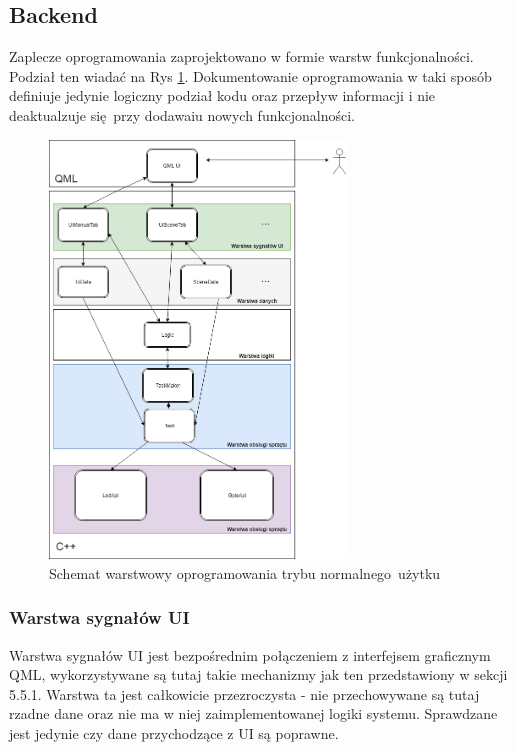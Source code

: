 \documentclass[12pt, eng, twoside, openany, final]{mgr}
\begin{document}
                \subsection{Backend}
                Zaplecze oprogramowania zaprojektowano w formie warstw funkcjonalności. Podział ten wiadać na Rys \ref{fig:layers}. Dokumentowanie oprogramowania w taki sposób definiuje jedynie logiczny podział kodu oraz przepływ informacji i nie deaktualzuje się przy dodawaiu nowych funkcjonalności.  
                    \begin{figure}[H]
                    \begin{center}
                        \includegraphics[width=0.7\textwidth]{inz_diag.png}
                        \caption{Schemat warstwowy oprogramowania trybu normalnego~użytku} \label{fig:layers}
                    \end{center}
                    \end{figure}
                \subsubsection{Warstwa sygnałów UI}
                Warstwa sygnałów UI jest bezpośrednim połączeniem z interfejsem graficznym QML, wykorzystywane są tutaj takie mechanizmy jak ten przedstawiony w sekcji 5.5.1. Warstwa ta jest całkowicie przezroczysta - nie przechowywane są tutaj rzadne dane oraz nie ma w niej zaimplementowanej logiki systemu. Sprawdzane jest jedynie czy dane przychodzące z UI są poprawne.
                
\end{document}
